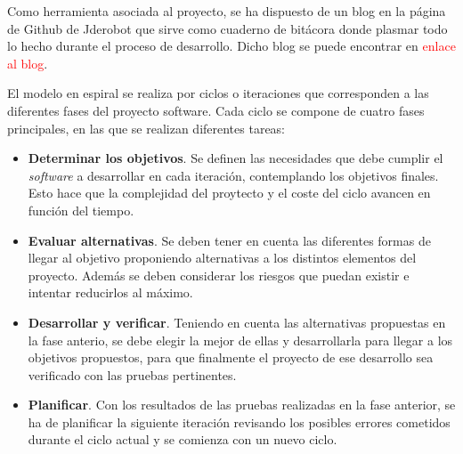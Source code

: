 Como herramienta asociada al proyecto, se ha dispuesto de un blog en la página de Github de Jderobot que sirve como cuaderno de bitácora donde plasmar todo lo hecho durante el proceso de desarrollo. Dicho blog se puede encontrar en \textcolor{red}{enlace al blog}.

El modelo en espiral se realiza por ciclos o iteraciones que corresponden a las diferentes fases del proyecto software. Cada ciclo se compone de cuatro fases principales, en las que se realizan diferentes tareas:

\begin{itemize}
    \item \textbf{Determinar los objetivos}. Se definen las necesidades que debe cumplir el \textit{software} a desarrollar en cada iteración, contemplando los objetivos finales. Esto hace que la complejidad del proytecto y el coste del ciclo avancen en función del tiempo.
    \item \textbf{Evaluar alternativas}. Se deben tener en cuenta las diferentes formas de llegar al objetivo proponiendo alternativas a los distintos elementos del proyecto. Además se deben considerar los riesgos que puedan existir e intentar reducirlos al máximo.
    \item \textbf{Desarrollar y verificar}. Teniendo en cuenta las alternativas propuestas en la fase anterio, se debe elegir la mejor de ellas y desarrollarla para llegar a los objetivos propuestos, para que finalmente el proyecto de ese desarrollo sea verificado con las pruebas pertinentes.
    \item \textbf{Planificar}. Con los resultados de las pruebas realizadas en la fase anterior, se ha de planificar la siguiente iteración revisando los posibles errores cometidos durante el ciclo actual y se comienza con un nuevo ciclo.
\end{itemize}



